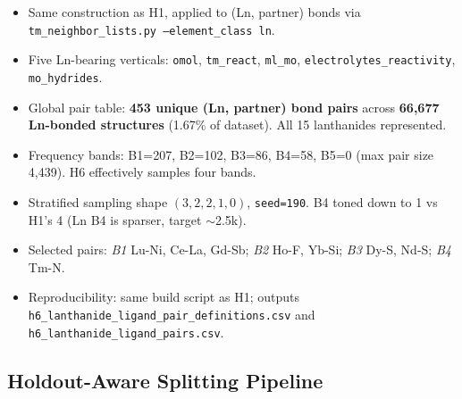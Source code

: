 \begin{itemize}
  \item Same construction as H1, applied to (Ln, partner) bonds via
    \texttt{tm\_neighbor\_lists.py --element\_class ln}.
  \item Five Ln-bearing verticals: \texttt{omol}, \texttt{tm\_react},
    \texttt{ml\_mo}, \texttt{electrolytes\_reactivity},
    \texttt{mo\_hydrides}.
  \item Global pair table: \textbf{453 unique (Ln, partner) bond pairs}
    across \textbf{66{,}677 Ln-bonded structures} (1.67\% of dataset).
    All 15 lanthanides represented.
  \item Frequency bands: B1=207, B2=102, B3=86, B4=58, B5=0 (max pair
    size 4{,}439). H6 effectively samples four bands.
  \item Stratified sampling shape $(3, 2, 2, 1, 0)$, \texttt{seed=190}.
    B4 toned down to 1 vs H1's 4 (Ln B4 is sparser, target $\sim$2.5k).
  \item Selected pairs: \emph{B1} Lu-Ni, Ce-La, Gd-Sb; \emph{B2} Ho-F,
    Yb-Si; \emph{B3} Dy-S, Nd-S; \emph{B4} Tm-N.
  \item Reproducibility: same build script as H1; outputs
    \texttt{h6\_lanthanide\_ligand\_pair\_definitions.csv} and
    \texttt{h6\_lanthanide\_ligand\_pairs.csv}.
\end{itemize}

\subsection{Holdout-Aware Splitting Pipeline}
\label{sec:eval-pipeline}

